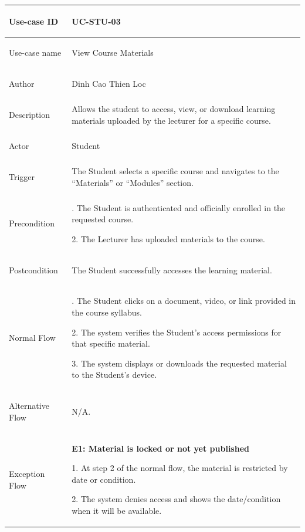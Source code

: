 {
\renewcommand{\arraystretch}{1.1}
\setlength{\tabcolsep}{8pt}
\begin{longtable}{|>{\bfseries\raggedright\arraybackslash}p{}|>{\raggedright\arraybackslash}p{}|}
\hline
Use-case ID & UC-STU-03 \\ \hline
Use-case name & View Course Materials \\ \hline
Author & Dinh Cao Thien Loc \\ \hline
Description & Allows the student to access, view, or download learning materials uploaded by the lecturer for a specific course. \\ \hline
Actor & Student \\ \hline
Trigger & The Student selects a specific course and navigates to the ``Materials'' or ``Modules'' section. \\ \hline
Precondition &
1. The Student is authenticated and officially enrolled in the requested course. \par
2. The Lecturer has uploaded materials to the course. \\ \hline
Postcondition & The Student successfully accesses the learning material. \\ \hline
Normal Flow &
1. The Student clicks on a document, video, or link provided in the course syllabus. \par
2. The system verifies the Student's access permissions for that specific material. \par
3. The system displays or downloads the requested material to the Student's device. \\ \hline
Alternative Flow & N/A. \\ \hline
Exception Flow &
\textbf{E1: Material is locked or not yet published} \par
1. At step 2 of the normal flow, the material is restricted by date or condition. \par
2. The system denies access and shows the date/condition when it will be available. \\ \hline
\end{longtable}
}

